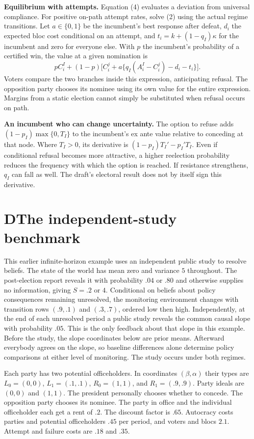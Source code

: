 \documentclass[11pt,letterpaper]{article}
\newcommand{\sect}[1]{\section*{\color{ink}#1}}
\newcommand{\lead}[1]{\textbf{#1}\enspace}
\begin{document}
\lead{Equilibrium with attempts.} Equation (4) evaluates a deviation from universal compliance. For positive on-path attempt rates, solve (2) using the actual regime transitions. Let $a\in\{0,1\}$ be the incumbent's best response after defeat, $d_i$ the expected bloc cost conditional on an attempt, and $t_i=k+(1-q_I)\kappa$ for the incumbent and zero for everyone else. With $p$ the incumbent's probability of a certified win, the value at a given nomination is
\[
 p C_i^I+(1-p)\big[C_i^j+a\{q_I(A_i^I-C_i^j)-d_i-t_i\}\big].
\]
Voters compare the two branches inside this expression, anticipating refusal. The opposition party chooses its nominee using its own value for the entire expression. Margins from a static election cannot simply be substituted when refusal occurs on path.

\lead{An incumbent who can change uncertainty.} The option to refuse adds $(1-p_I)\max\{0,T_I\}$ to the incumbent's ex ante value relative to conceding at that node. Where $T_I>0$, its derivative is $(1-p_I)T_I'-p_I'T_I$. Even if conditional refusal becomes more attractive, a higher reelection probability reduces the frequency with which the option is reached. If resistance strengthens, $q_I$ can fall as well. The draft's electoral result does not by itself sign this derivative.

\newpage
\sect{D\quad The independent-study benchmark}
This earlier infinite-horizon example uses an independent public study to resolve beliefs. The state of the world has mean zero and variance $5$ throughout. The post-election report reveals it with probability $.04$ or $.80$ and otherwise supplies no information, giving $S=.2$ or $4$. Conditional on beliefs about policy consequences remaining unresolved, the monitoring environment changes with transition rows $(.9,.1)$ and $(.3,.7)$, ordered low then high. Independently, at the end of each unresolved period a public study reveals the common causal slope with probability $.05$. This is the only feedback about that slope in this example. Before the study, the slope coordinates below are prior means. Afterward everybody agrees on the slope, so baseline differences alone determine policy comparisons at either level of monitoring. The study occurs under both regimes.

Each party has two potential officeholders. In coordinates $(\beta,\alpha)$ their types are $L_0=(0,0)$, $L_1=(.1,.1)$, $R_0=(1,1)$, and $R_1=(.9,.9)$. Party ideals are $(0,0)$ and $(1,1)$. The president personally chooses whether to concede. The opposition party chooses its nominee. The party in office and the individual officeholder each get a rent of $.2$. The discount factor is $.65$. Autocracy costs parties and potential officeholders $.45$ per period, and voters and blocs $2.1$. Attempt and failure costs are $.18$ and $.35$.
\end{document}
